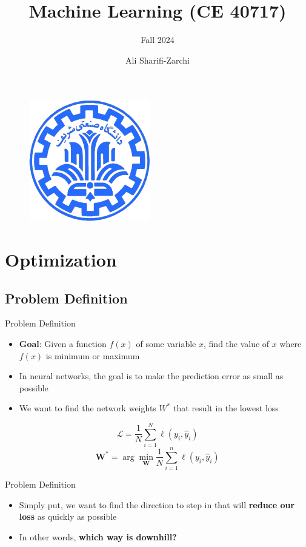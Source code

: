 \documentclass[serif, aspectratio=169]{beamer}
\author{Ali Sharifi-Zarchi}
\title{Machine Learning (CE 40717)}
\subtitle{Fall 2024}
\institute{
    CE Department \\
    Sharif University of Technology
}
\begin{document}
\begin{frame}
    \titlepage
    \vspace*{-0.6cm}
    \begin{figure}[htpb]
        \begin{center}
            \includegraphics[keepaspectratio, scale=0.25]{pic/sharif-main-logo.png}
        \end{center}
    \end{figure}
\end{frame}

\begin{frame}    
\tableofcontents[sectionstyle=show,
subsectionstyle=show/shaded/hide,
subsubsectionstyle=show/shaded/hide]
\end{frame}

\section{Optimization}
\subsection{Problem Definition}

\begin{frame}{Problem Definition}
    \begin{itemize}%
        \item \textbf{Goal}: Given a function $f(x)$ of some variable $x$, find the value of $x$ where $f(x)$ is minimum or maximum
        \item In neural networks, the goal is to make the prediction error as small as possible
        \item We want to find the network weights $W^*$ that result in the lowest loss
    \end{itemize}
    
    \[
    \mathcal{L} = \frac{1}{N} \sum_{i=1}^{N} \ell(y_i, \hat{y}_i)
    \]
    \[
    \mathbf{W}^* = \arg\min_{\mathbf{W}} \frac{1}{N} \sum_{i=1}^{n} \ell(y_i, \hat{y}_i)
    \]
\end{frame}
\begin{frame}{Problem Definition}
    \begin{itemize}
        \item Simply put, we want to find the direction to step in that will \textbf{reduce our loss} as quickly as possible
        \item In other words, \textbf{which way is downhill?}
    \end{itemize}
\end{frame}
\end{document}
